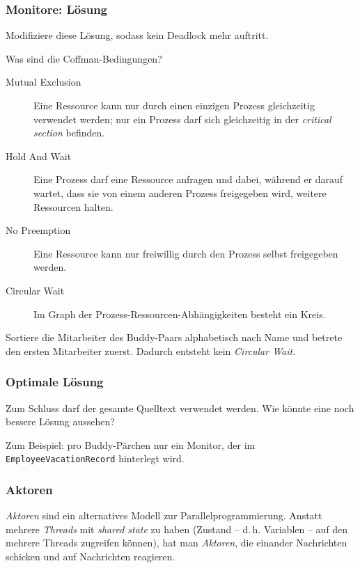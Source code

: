 \documentclass{beamer}
\begin{document}
\begin{frame}
  \frametitle{Monitore: Lösung}
  Modifiziere diese Lösung, sodass kein Deadlock mehr auftritt.
  
  Was sind die Coffman-Bedingungen?
  \pause
  \begin{description}
  \item[Mutual Exclusion]
    Eine Ressource kann nur durch einen einzigen Prozess gleichzeitig verwendet werden;
    nur ein Prozess darf sich gleichzeitig in der \emph{critical section} befinden.
  \item[Hold And Wait]
    Eine Prozess darf eine Ressource anfragen und dabei, während er darauf wartet, dass sie von einem anderen Prozess freigegeben wird, weitere Ressourcen halten.
  \item[No Preemption]
    Eine Ressource kann nur freiwillig durch den Prozess selbst freigegeben werden.
  \item[Circular Wait]
    Im Graph der Prozess-Ressourcen-Abhängigkeiten besteht ein Kreis.
  \end{description}
  
  \pause
  Sortiere die Mitarbeiter des Buddy-Paars alphabetisch nach Name
  und betrete den ersten Mitarbeiter zuerst.
  Dadurch entsteht kein \emph{Circular Wait}.
\end{frame}

\begin{frame}
  \frametitle{Optimale Lösung}
  Zum Schluss darf der gesamte Quelltext verwendet werden.
  Wie könnte eine noch bessere Lösung aussehen?
  
  \pause
  Zum Beispiel: pro Buddy-Pärchen nur ein Monitor,
  der im \lstinline{EmployeeVacationRecord} hinterlegt wird.
\end{frame}

\begin{frame}
  \frametitle{Aktoren}
  \emph{Aktoren} sind ein alternatives Modell zur Parallelprogrammierung.
  Anstatt mehrere \emph{Threads} mit \emph{shared state} zu haben
  (Zustand – d.\,h. Variablen – auf den mehrere Threads zugreifen können),
  hat man \emph{Aktoren}, die einander Nachrichten schicken und auf Nachrichten reagieren.
\end{frame}
\end{document}
